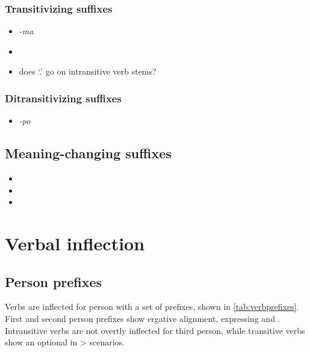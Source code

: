 \documentclass{memoir}
\begin{document}
\subsection{Transitivizing suffixes}

\begin{itemize}
\item
  \emph{-ma} 
\item
\item
  does  `.' go on intransitive verb stems?
\end{itemize}

\subsection{Ditransitivizing suffixes}

\begin{itemize}
\tightlist
\item
  \emph{-po}
\end{itemize}

\section{Meaning-changing suffixes}

\begin{itemize}
\item
   
\item
\item
\end{itemize}

\chapter{\texorpdfstring{Verbal inflection
\label{verbinfl}}{Verbal inflection }}


\section{\texorpdfstring{Person prefixes
\label{sec:verbperson}}{Person prefixes }}

Verbs are inflected for person with a set of prefixes, shown in
\cref{tab:verbprefixes}. First and second person prefixes show ergative
alignment, expressing  and .
 Intransitive verbs are not overtly
inflected for third person, while transitive verbs show an optional
 in \textgreater{}
scenarios.
\end{document}
